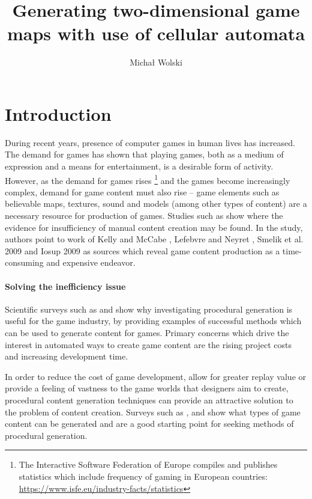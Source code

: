 \documentclass[12pt]{report}
\title{Generating two-dimensional game maps with use of cellular automata}
\author{Michał Wolski}
\begin{document}
 
\maketitle
\tableofcontents 

\chapter{Introduction} \label{rozdzial.wstep} 
During recent years, presence of computer games in human lives has increased. The demand for games has shown that playing games, both as a medium of expression and a means for entertainment, is a desirable form of activity. However, as the demand for games rises \footnote{The Interactive Software Federation of Europe compiles and publishes statistics which include frequency of gaming in European countries: \url{https://www.isfe.eu/industry-facts/statistics}} and the games become increasingly complex, demand for game content must also rise -- game elements such as believable maps, textures, sound and models (among other types of content) are a necessary resource for production of games. Studies such as \autocite{hendrikx2013procedural} show where the evidence for insufficiency of manual content creation may be found. In the study, authors point to work of Kelly and McCabe \autocite{kelly2007citygen}, Lefebvre and Neyret \autocite{lefebvre2003pattern}, Smelik et al. 2009 \autocite{smelik2009survey} and Iosup 2009 \autocite{iosup2009poggi} as sources which reveal game content production as a time-consuming and expensive endeavor.

\subsubsection{Solving the inefficiency issue}
Scientific surveys such as \autocite{hendrikx2013procedural} and \autocite{smelik2009survey} show why investigating procedural generation is useful for the game industry, by providing examples of successful methods which can be used to generate content for games. Primary concerns which drive the interest in automated ways to create game content are the rising project costs and increasing development time.

In order to reduce the cost of game development, allow for greater replay value or provide a feeling of vastness to the game worlds that designers aim to create, procedural content generation techniques can provide an attractive solution to the problem of content creation. Surveys such as \autocite{hendrikx2013procedural}, \autocite{togelius2011search} and \autocite{de2011survey} show what types of game content can be generated and are a good starting point for seeking methods of procedural generation.
\end{document}
